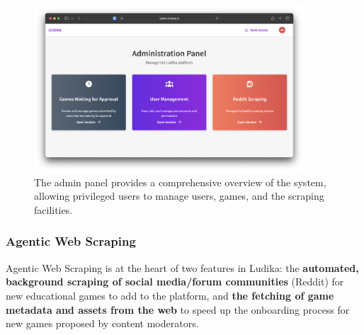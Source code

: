\documentclass[11pt,italian,a4paper]{article}
\begin{document}
\begin{figure}[H]
    \centering
    \includegraphics[width=0.9\textwidth,trim={0 1cm 0 1cm}]{figures/admin_panel.png}
    \caption{The admin panel provides a comprehensive overview of the system, allowing privileged users to manage users, games, and the scraping facilities.}
\end{figure}

\pagebreak

\subsubsection{Agentic Web Scraping}
Agentic Web Scraping is at the heart of two features in Ludika: the \textbf{automated, background scraping of social media/forum communities} (Reddit) for new educational games to add to the platform, and \textbf{the fetching of game metadata and assets from the web} to speed up the onboarding process for new games proposed by content moderators.
\end{document}
